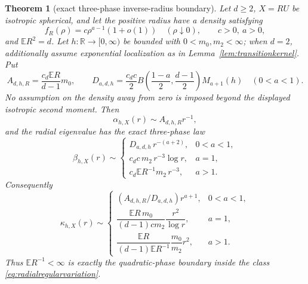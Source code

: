 \documentclass[11pt]{article}
\newtheorem{theorem}{Theorem}[section]
\newcommand{\E}{\mathbb E}
\newcommand{\R}{\mathbb R}
\begin{document}
\begin{theorem}[exact three-phase inverse-radius boundary]
\label{thm:radialphase}
Let $d\ge2$, $X=RU$ be isotropic spherical, and let the positive radius have a density satisfying
\begin{equation}
 f_R(\rho)=c\rho^{a-1}(1+o(1))\quad(\rho\downarrow0),
 \qquad c>0,\ a>0,
 \label{eq:radialregularvariation}
\end{equation}
and $\E R^2=d$.  Let $h:\R\to[0,\infty)$ be bounded with $0<m_0,m_2<\infty$; when $d=2$, additionally
assume exponential localization as in Lemma~\ref{lem:transitionkernel}.  Put
\[
 A_{d,h,R}=\frac{c_d\E R}{d-1}m_0,
 \qquad
 D_{a,d,h}=\frac{c_dc}{2}B\!\left(\frac{1-a}{2},\frac{d-1}{2}\right)M_{a+1}(h)
 \quad(0<a<1).
\]
No assumption on the density away from zero is imposed beyond the displayed isotropic second moment.  Then
\begin{equation}
 \alpha_{h,X}(r)\sim A_{d,h,R}r^{-1},
 \label{eq:phasealpha}
\end{equation}
and the radial eigenvalue has the exact three-phase law
\begin{equation}
 \beta_{h,X}(r)\sim
 \begin{cases}
 D_{a,d,h}\,r^{-(a+2)},&0<a<1,\\[2mm]
 c_dc\,m_2\,r^{-3}\log r,&a=1,\\[2mm]
 c_d\E R^{-1}m_2\,r^{-3},&a>1.
 \end{cases}
 \label{eq:exactthreephase}
\end{equation}
Consequently
\begin{equation}
 \kappa_{h,X}(r)\sim
 \begin{cases}
 (A_{d,h,R}/D_{a,d,h})r^{a+1},&0<a<1,\\[1mm]
 \dfrac{\E R\,m_0}{(d-1)c m_2}\dfrac{r^2}{\log r},&a=1,\\[3mm]
 \dfrac{\E R}{(d-1)\E R^{-1}}\dfrac{m_0}{m_2}r^2,&a>1.
 \end{cases}
 \label{eq:exactthreephasekappa}
\end{equation}
Thus $\E R^{-1}<\infty$ is exactly the quadratic-phase boundary inside the class
\eqref{eq:radialregularvariation}.
\end{theorem}
\end{document}
